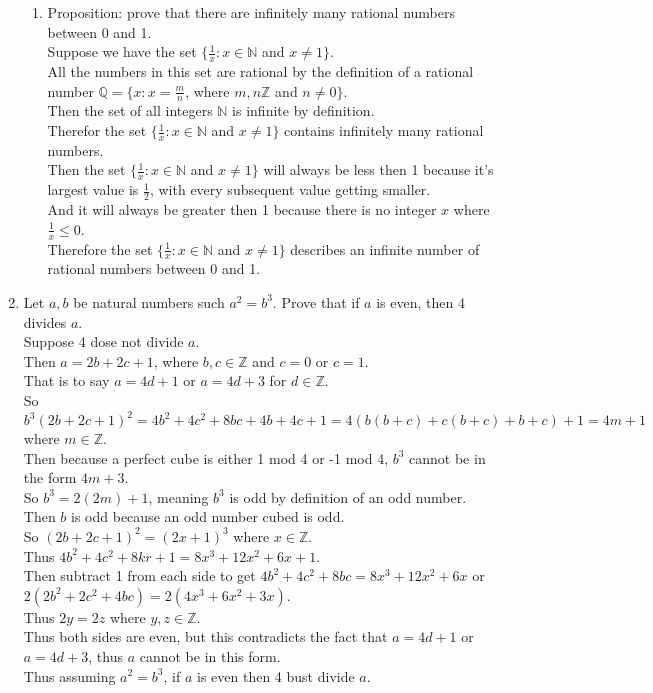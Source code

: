 \documentclass[sigconf]{article}
\begin{document}
\begin{enumerate}
\begin{enumerate}
      \item Proposition: prove that there are infinitely many rational numbers between 0 and 1.\\
            Suppose we have the set $\{\frac{1}{x}:x\in\mathbb{N}$ and $x\neq1\}$.\\
            All the numbers in this set are rational by the definition of a rational number $\mathbb{Q}=\{x:x=\frac{m}{n}$, where $m,n\mathbb{Z}$ and $n\neq0\}$.\\
            Then the set of all integers $\mathbb{N}$ is infinite by definition.\\
            Therefor the set $\{\frac{1}{x}:x\in\mathbb{N}$ and $x\neq1\}$ contains infinitely many rational numbers.\\
            Then the set $\{\frac{1}{x}:x\in\mathbb{N}$ and $x\neq1\}$ will always be less then 1 because it's largest value is $\frac{1}{2}$, with every subsequent value getting smaller.\\
            And it will always be greater then 1 because there is no integer $x$ where $\frac{1}{x}\leq0$.\\
            Therefore the set $\{\frac{1}{x}:x\in\mathbb{N}$ and $x\neq1\}$ describes an infinite number of rational numbers between 0 and 1.

    \end{enumerate}
  \item Let $a,b$ be natural numbers such $a^2=b^3$. Prove that if $a$ is even, then 4 divides $a$.\\
        Suppose 4 dose not divide $a$.\\
        Then $a=2b+2c+1$, where $b,c\in\mathbb{Z}$ and $c=0$ or $c=1$.\\
        That is to say $a=4d+1$ or $a=4d+3$ for $d\in\mathbb{Z}$.\\
        So $b^3(2b+2c+1)^2=4b^2+4c^2+8bc+4b+4c+1=4(b(b+c)+c(b+c)+b+c)+1=4m+1$ where $m\in\mathbb{Z}$.\\
        Then because a perfect cube is either 1 mod 4 or -1 mod 4, $b^3$ cannot be in the form $4m+3$.\\
        So $b^3=2(2m)+1$, meaning $b^3$ is odd by definition of an odd number.\\
        Then $b$ is odd because an odd number cubed is odd.\\
        So $(2b+2c+1)^2=(2x+1)^3$ where $x\in\mathbb{Z}$.\\
        Thus $4b^2+4c^2+8kr+1=8x^3+12x^2+6x+1$.\\
        Then subtract 1 from each side to get $4b^2+4c^2+8bc=8x^3+12x^2+6x$ or $2(2b^2+2c^2+4bc)=2(4x^3+6x^2+3x)$.\\
        Thus $2y=2z$ where $y,z\in\mathbb{Z}$.\\
        Thus both sides are even, but this contradicts the fact that $a=4d+1$ or $a=4d+3$, thus $a$ cannot be in this form.\\
        Thus assuming $a^2=b^3$, if $a$ is even then 4 bust divide $a$.





\end{enumerate}
\end{document}

